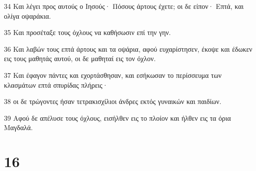 \par 34 Και λέγει προς αυτούς ο Ιησούς· Πόσους άρτους έχετε; οι δε είπον· Επτά, και ολίγα οψαράκια.
\par 35 Και προσέταξε τους όχλους να καθήσωσιν επί την γην.
\par 36 Και λαβών τους επτά άρτους και τα οψάρια, αφού ευχαρίστησεν, έκοψε και έδωκεν εις τους μαθητάς αυτού, οι δε μαθηταί εις τον όχλον.
\par 37 Και έφαγον πάντες και εχορτάσθησαν, και εσήκωσαν το περίσσευμα των κλασμάτων επτά σπυρίδας πλήρεις·
\par 38 οι δε τρώγοντες ήσαν τετρακισχίλιοι άνδρες εκτός γυναικών και παιδίων.
\par 39 Αφού δε απέλυσε τους όχλους, εισήλθεν εις το πλοίον και ήλθεν εις τα όρια Μαγδαλά.

\chapter{16}

